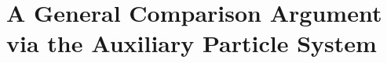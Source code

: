 \section{A General Comparison Argument via the Auxiliary Particle System}
\label{sec:general-comparison-argument}

















